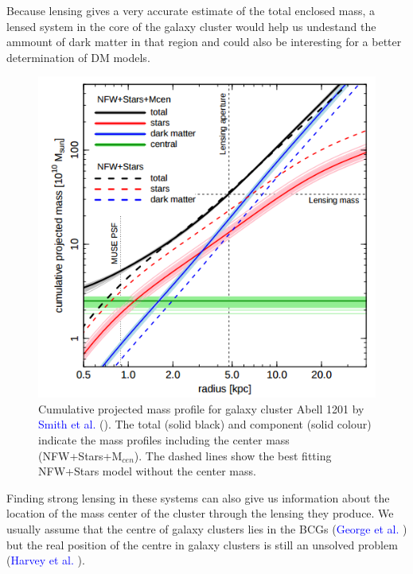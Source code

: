 Because lensing gives a very accurate estimate of the total enclosed mass, a lensed system in the core of the galaxy cluster would help us undestand the ammount of dark matter in that region and could also be interesting for a better determination of DM models.

\begin{figure}[H]
\centering
\includegraphics[width=12cm]{images/smith.png}
\caption[Projected mass of cluster Abell 1201]{Cumulative projected mass profile for galaxy cluster Abell 1201 by \textcolor{blue}{Smith et al.} (\citeyear{Reference34}). The total (solid black) and component (solid colour) indicate the mass profiles including the center mass (NFW+Stars+M$_{cen}$). The dashed lines show the best fitting NFW+Stars model without the center mass.}
\end{figure}

Finding strong lensing in these systems can also give us information about the location of the mass center of the cluster through the lensing they produce. We usually assume that the centre of galaxy clusters lies in the BCGs (\textcolor{blue}{George et al.} \citeyear{Reference18}) but the real position of the centre in galaxy clusters is still an unsolved problem (\textcolor{blue}{Harvey et al.} \citeyear{Reference13}). 

